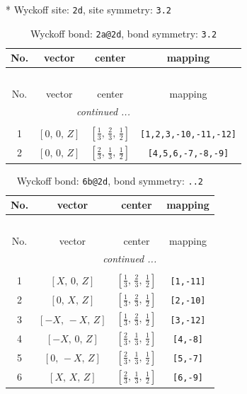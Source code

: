 \documentclass[fleqn,8pt]{jsarticle}
\begin{document}
* Wyckoff site: {\tt 2d}, site symmetry: {\tt 3.2}
\renewcommand{\arraystretch}{1.2}
\begin{longtable}{cccc}
\caption{Wyckoff bond: {\tt 2a@2d}, bond symmetry: {\tt 3.2}}
 \\
 \hline \hline
No. & vector & center & mapping \\ \hline \endfirsthead

\multicolumn{3}{l}{\tablename\ \thetable{}} \\
 \hline \hline
No. & vector & center & mapping \\ \hline \endhead

 \hline \hline
\multicolumn{3}{r}{\footnotesize\it continued ...} \\ \endfoot

 \hline \hline
\multicolumn{3}{r}{} \\ \endlastfoot

1 & $\left[ 0,\, 0,\, Z \right]$ & $\left[ \frac{1}{3},\, \frac{2}{3},\, \frac{1}{2} \right]$ & {\tt [1,2,3,-10,-11,-12]} \\ \hline
2 & $\left[ 0,\, 0,\, Z \right]$ & $\left[ \frac{2}{3},\, \frac{1}{3},\, \frac{1}{2} \right]$ & {\tt [4,5,6,-7,-8,-9]} \\
\end{longtable}
\renewcommand{\arraystretch}{1.2}
\begin{longtable}{cccc}
\caption{Wyckoff bond: {\tt 6b@2d}, bond symmetry: {\tt ..2}}
 \\
 \hline \hline
No. & vector & center & mapping \\ \hline \endfirsthead

\multicolumn{3}{l}{\tablename\ \thetable{}} \\
 \hline \hline
No. & vector & center & mapping \\ \hline \endhead

 \hline \hline
\multicolumn{3}{r}{\footnotesize\it continued ...} \\ \endfoot

 \hline \hline
\multicolumn{3}{r}{} \\ \endlastfoot

1 & $\left[ X,\, 0,\, Z \right]$ & $\left[ \frac{1}{3},\, \frac{2}{3},\, \frac{1}{2} \right]$ & {\tt [1,-11]} \\ \hline
2 & $\left[ 0,\, X,\, Z \right]$ & $\left[ \frac{1}{3},\, \frac{2}{3},\, \frac{1}{2} \right]$ & {\tt [2,-10]} \\ \hline
3 & $\left[ - X,\, - X,\, Z \right]$ & $\left[ \frac{1}{3},\, \frac{2}{3},\, \frac{1}{2} \right]$ & {\tt [3,-12]} \\ \hline
4 & $\left[ - X,\, 0,\, Z \right]$ & $\left[ \frac{2}{3},\, \frac{1}{3},\, \frac{1}{2} \right]$ & {\tt [4,-8]} \\ \hline
5 & $\left[ 0,\, - X,\, Z \right]$ & $\left[ \frac{2}{3},\, \frac{1}{3},\, \frac{1}{2} \right]$ & {\tt [5,-7]} \\ \hline
6 & $\left[ X,\, X,\, Z \right]$ & $\left[ \frac{2}{3},\, \frac{1}{3},\, \frac{1}{2} \right]$ & {\tt [6,-9]} \\
\end{longtable}
\end{document}
